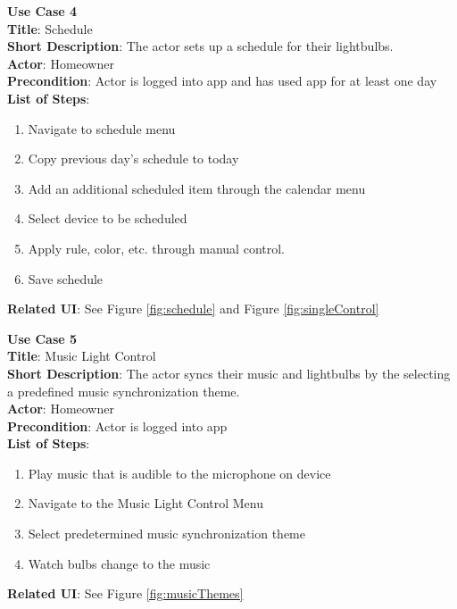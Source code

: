 \documentclass[12pt]{article}
\begin{document}
\begin{samepage}
  \begin{framed}
    \textbf{Use Case 4} \\
    \textbf{Title}: Schedule \\
    \textbf{Short Description}: The actor sets up a schedule for their lightbulbs. \\
    \textbf{Actor}: Homeowner \\
    \textbf{Precondition}: Actor is logged into app and has used app for at least one day \\
    \textbf{List of Steps}:
    \begin{enumerate}
      \item Navigate to schedule menu
      \item Copy previous day's schedule to today
      \item Add an additional scheduled item through the calendar menu
      \item Select device to be scheduled
      \item Apply rule, color, etc. through manual control.
      \item Save schedule
    \end{enumerate}
    \textbf{Related UI}:  See Figure \ref{fig:schedule} and Figure \ref{fig:singleControl}
  \end{framed}
\end{samepage}

\begin{samepage}
  \begin{framed}
    \textbf{Use Case 5} \\
    \textbf{Title}: Music Light Control \\
    \textbf{Short Description}: The actor syncs their music and lightbulbs by the selecting a predefined music synchronization theme.\\
    \textbf{Actor}: Homeowner \\
    \textbf{Precondition}: Actor is logged into app \\
    \textbf{List of Steps}:
    \begin{enumerate}
      \item Play music that is audible to the microphone on device
      \item Navigate to the Music Light Control Menu
      \item Select predetermined music synchronization theme
      \item Watch bulbs change to the music
    \end{enumerate}
    \textbf{Related UI}: See Figure \ref{fig:musicThemes} 
  \end{framed}
\end{samepage}
\end{document}
